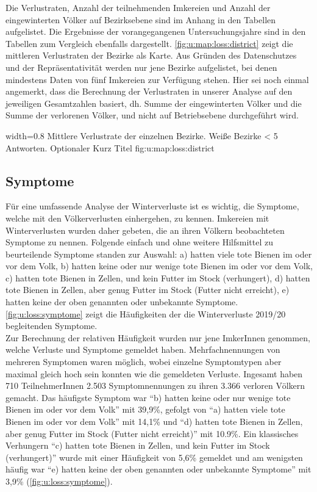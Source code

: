 Die Verlustraten, Anzahl der teilnehmenden Imkereien und Anzahl der eingewinterten Völker auf Bezirksebene sind im Anhang in den Tabellen  aufgelistet. Die Ergebnisse der vorangegangenen Untersuchungsjahre sind in den Tabellen zum Vergleich ebenfalls dargestellt. \cref{fig:u:map:loss:district} zeigt die mittleren Verlustraten der Bezirke als Karte. Aus Gründen des Datenschutzes und der Repräsentativität werden nur jene Bezirke aufgelistet, bei denen mindestens Daten von fünf Imkereien zur Verfügung stehen. Hier sei noch einmal angemerkt, dass die Berechnung der Verlustraten in unserer Analyse auf den jeweiligen Gesamtzahlen basiert, dh. Summe der eingewinterten Völker und die Summe der verlorenen Völker, und nicht auf Betriebsebene durchgeführt wird.

  {width=0.8\textwidth} %
  {Mittlere Verlustrate der einzelnen Bezirke. Weiße Bezirke < 5 Antworten.} %
  {Optionaler Kurz Titel} %
  {fig:u:map:loss:district} %

\subsection{Symptome}

Für eine umfassende Analyse der Winterverluste ist es wichtig, die Symptome, welche mit den Völkerverlusten einhergehen, zu kennen. Imkereien mit Winterverlusten wurden daher gebeten, die an ihren Völkern beobachteten Symptome zu nennen. Folgende einfach und ohne weitere Hilfsmittel zu beurteilende Symptome standen zur Auswahl: a) hatten viele tote Bienen im oder vor dem Volk, b) hatten keine oder nur wenige tote Bienen im oder vor dem Volk, c) hatten tote Bienen in Zellen, und kein Futter im Stock (verhungert), d) hatten tote Bienen in Zellen, aber genug Futter im Stock (Futter nicht erreicht), e) hatten keine der oben genannten oder unbekannte Symptome. \cref{fig:u:loss:symptome} zeigt die Häufigkeiten der die Winterverluste 2019/20 begleitenden Symptome. 
\\
Zur Berechnung der relativen Häufigkeit wurden nur jene ImkerInnen genommen, welche Verluste und Symptome gemeldet haben. Mehrfachnennungen von mehreren Symptomen waren möglich, wobei einzelne Symptomtypen aber maximal gleich hoch sein konnten wie die gemeldeten Verluste. Ingesamt haben 710 TeilnehmerInnen 2.503 Symptomnennungen zu ihren 3.366 verloren Völkern gemacht. Das häufigste Symptom war \enquote{b) hatten keine oder nur wenige tote Bienen im oder vor dem Volk} mit 39,9\%, gefolgt von \enquote{a) hatten viele tote Bienen im oder vor dem Volk} mit 14,1\% und \enquote{d) hatten tote Bienen in Zellen, aber genug Futter im Stock (Futter nicht erreicht)} mit 10.9\%. Ein klassisches Verhungern \enquote{c) hatten tote Bienen in Zellen, und kein Futter im Stock (verhungert)} wurde mit einer Häufigkeit von 5,6\% gemeldet und am wenigsten häufig war \enquote{e) hatten keine der oben genannten oder unbekannte Symptome} mit 3,9\% (\cref{fig:u:loss:symptome}).

